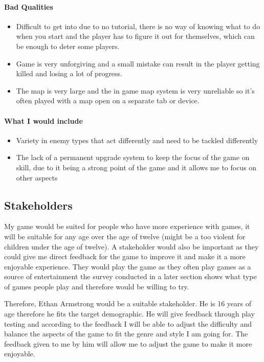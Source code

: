 \documentclass{article}
\newcommand{\parBr}{\vspace{5mm}}%
\begin{document}
\paragraph{Bad Qualities}
\begin{itemize}
\item Difficult to get into due to no tutorial, there is no way of knowing what to do when you start and the player has to figure it out for themselves, which can be enough to deter some players.
\item Game is very unforgiving and a small mistake can result in the player getting killed and losing a lot of progress.
\item The map is very large and the in game map system is very unreliable so it's often played with a map open on a separate tab or device.
\end{itemize}

\paragraph{What I would include}
\begin{itemize}
\item Variety in enemy types that act differently and need to be tackled differently
\item The lack of a permanent upgrade system to keep the focus of the game on skill, due to it being a strong point of the game and it allows me to focus on other aspects
\end{itemize}

\subsection{Stakeholders}
My game would be suited for people who have more experience with games, it will be suitable for any age over the age of twelve (might be a too violent for children under the age of twelve). A stakeholder would also be important as they could give me direct feedback for the game to improve it and make it a more enjoyable experience. They would play the game as they often play games as a source of entertainment the survey conducted in a later section shows what type of games people play and therefore would be willing to try.

\parBr

Therefore, Ethan Armstrong would be a suitable stakeholder. He is 16 years of age therefore he fits the target demographic. He will give feedback through play testing and according to the feedback I will be able to adjust the difficulty and balance the aspects of the game to fit the genre and style I am going for. The feedback given to me by him will allow me to adjust the game to make it more enjoyable. 
\end{document}
